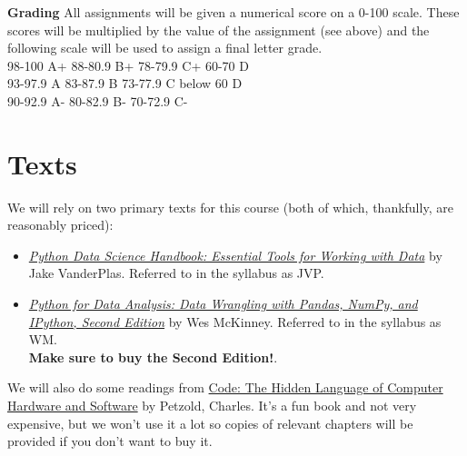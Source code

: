 \documentclass[12pt]{article}
\begin{document}
\textbf{Grading}
All assignments will be given a numerical score on a 0-100 scale.  These scores will be multiplied by the value of the assignment (see above) and the following scale will be used to assign a final letter grade.  \\

\hspace*{.2in} 98-100 A+ 	\hspace*{.6in}  88-80.9 B+  	\hspace*{.57in} 78-79.9 C+  		\hspace*{.44in} 60-70 D  	\\
\hspace*{.2in} 93-97.9 A	\hspace*{.68in} 83-87.9 B  	\hspace*{.695in} 73-77.9 C		\hspace*{.57in} below 60 D\\
\hspace*{.2in} 90-92.9 A- 	\hspace*{.63in} 	80-82.9 B- 	\hspace*{.64in} 70-72.9 C-	\\

\section{Texts}

We will rely on two primary texts for this course (both of which, thankfully, are reasonably priced):

\begin{itemize}
	\item \href{https://www.amazon.com/Python-Data-Science-Handbook-Essential-dp-1491912057/dp/1491912057}{\emph{Python Data Science Handbook: Essential Tools for Working with Data}} by Jake VanderPlas. Referred to in the syllabus as JVP.
	\item \href{https://www.amazon.com/gp/product/1491957662}{\emph{Python for Data Analysis: Data Wrangling with Pandas, NumPy, and IPython, Second Edition}} by Wes McKinney. Referred to in the syllabus as WM. \\
	\textbf{Make sure to buy the Second Edition!}.
\end{itemize}

We will also do some readings from \href{https://www.amazon.com/Code-Language-Computer-Hardware-Software/dp/0735611319}{Code: The Hidden Language of Computer Hardware and Software} by Petzold, Charles. It's a fun book and not very expensive, but we won't use it a lot so copies of relevant chapters will be provided if you don't want to buy it.
\end{document}
